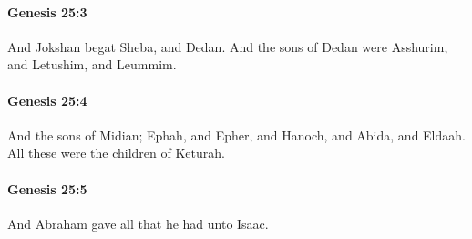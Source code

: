 		\paragraph{Genesis 25:3} %
			\label{GENESIS-25-3}

			And Jokshan begat Sheba, and Dedan.  And the sons of Dedan were Asshurim, and Letushim, and Leummim.


		\paragraph{Genesis 25:4} %
			\label{GENESIS-25-4}

			And the sons of Midian; Ephah, and Epher, and Hanoch, and Abida, and Eldaah.  All these were the children of Keturah.


		\paragraph{Genesis 25:5} %
			\label{GENESIS-25-5}

			And Abraham gave all that he had unto Isaac.


